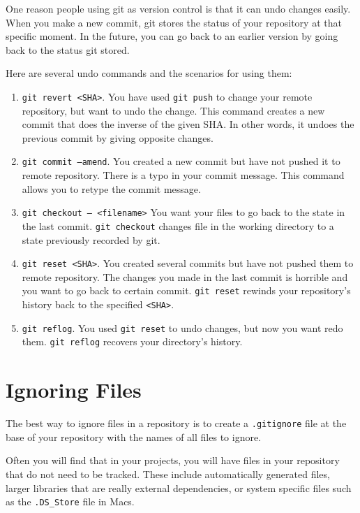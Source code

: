 \documentclass[12pt]{report}
\begin{document}
One reason people using git as version control is that it can undo changes easily. When you make a new commit, git stores the status of your repository at that specific moment. In the future, you can go back to an earlier version by going back to the status git stored.

Here are several undo commands and the scenarios for using them:

\begin{enumerate}
  \item \texttt{git revert <SHA>}. You have used \texttt{git push} to change your remote repository, but want to undo the change. This command creates a new commit that does the inverse of the given SHA. In other words, it undoes the previous commit by giving opposite changes.
  \item \texttt{git commit --amend}. You created a new commit but have not pushed it to remote repository. There is a typo in your commit message. This command allows you to retype the commit message.
  \item \texttt{git checkout -- <filename>} You want your files to go back to the state in the last commit. \texttt{git checkout} changes file in the working directory to a state previously recorded by git.
  \item \texttt{git reset <SHA>}. You created several commits but have not pushed them to remote repository. The changes you made in the last commit is horrible and you want to go back to certain commit. \texttt{git reset} rewinds your repository's history back to the specified \texttt{<SHA>}.
  \item \texttt{git reflog}. You used \texttt{git reset} to undo changes, but now you want redo them. \texttt{git reflog} recovers your directory's history.
\end{enumerate}
\section{Ignoring Files}

The best way to ignore files in a repository is to create a \texttt{.gitignore} file at the base of your repository with the names of all files to ignore.

Often you will find that in your projects, you will have files in your repository that do not need to be tracked.  These include automatically generated files, larger libraries that are really external dependencies, or system specific files such as the \texttt{.DS\_Store} file in Macs.
\end{document}
